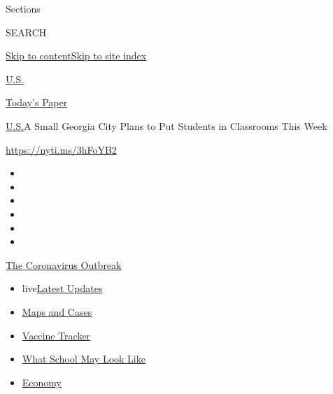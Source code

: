 Sections

SEARCH

\protect\hyperlink{site-content}{Skip to
content}\protect\hyperlink{site-index}{Skip to site index}

\href{https://www.nytimes.com/section/us}{U.S.}

\href{https://myaccount.nytimes.com/auth/login?response_type=cookie\&client_id=vi}{}

\href{https://www.nytimes.com/section/todayspaper}{Today's Paper}

\href{/section/us}{U.S.}\textbar{}A Small Georgia City Plans to Put
Students in Classrooms This Week

\url{https://nyti.ms/3hFoYB2}

\begin{itemize}
\item
\item
\item
\item
\item
\item
\end{itemize}

\href{https://www.nytimes.com/news-event/coronavirus?action=click\&pgtype=Article\&state=default\&region=TOP_BANNER\&context=storylines_menu}{The
Coronavirus Outbreak}

\begin{itemize}
\tightlist
\item
  live\href{https://www.nytimes.com/2020/08/01/world/coronavirus-covid-19.html?action=click\&pgtype=Article\&state=default\&region=TOP_BANNER\&context=storylines_menu}{Latest
  Updates}
\item
  \href{https://www.nytimes.com/interactive/2020/us/coronavirus-us-cases.html?action=click\&pgtype=Article\&state=default\&region=TOP_BANNER\&context=storylines_menu}{Maps
  and Cases}
\item
  \href{https://www.nytimes.com/interactive/2020/science/coronavirus-vaccine-tracker.html?action=click\&pgtype=Article\&state=default\&region=TOP_BANNER\&context=storylines_menu}{Vaccine
  Tracker}
\item
  \href{https://www.nytimes.com/interactive/2020/07/29/us/schools-reopening-coronavirus.html?action=click\&pgtype=Article\&state=default\&region=TOP_BANNER\&context=storylines_menu}{What
  School May Look Like}
\item
  \href{https://www.nytimes.com/live/2020/07/31/business/stock-market-today-coronavirus?action=click\&pgtype=Article\&state=default\&region=TOP_BANNER\&context=storylines_menu}{Economy}
\end{itemize}

